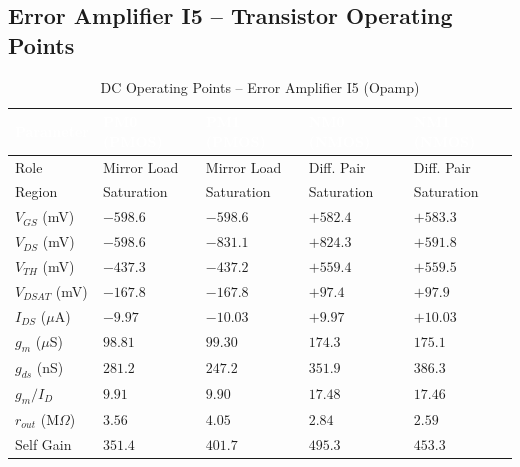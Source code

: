 \documentclass[12pt,a4paper]{article}
\begin{document}
\subsection{Error Amplifier I5 -- Transistor Operating Points}

\begin{table}[H]
  \centering
  \caption{DC Operating Points -- Error Amplifier I5 (Opamp)}
  \renewcommand{\arraystretch}{1.4}
  \begin{tabularx}{\textwidth}{lXXXX}
    \toprule
    \rowcolor{headerblue}
    \textcolor{white}{\textbf{Parameter}}
      & \textcolor{white}{\textbf{PM0 (PMOS)}}
      & \textcolor{white}{\textbf{PM1 (PMOS)}}
      & \textcolor{white}{\textbf{NM0 (NMOS)}}
      & \textcolor{white}{\textbf{NM1 (NMOS)}} \\
    \midrule
    \rowcolor{rowgray}
    Role              & Mirror Load & Mirror Load & Diff. Pair & Diff. Pair \\
    Region            & Saturation  & Saturation  & Saturation & Saturation \\
    \rowcolor{rowgray}
    $V_{GS}$ (mV)    & $-598.6$    & $-598.6$    & $+582.4$   & $+583.3$   \\
    $V_{DS}$ (mV)    & $-598.6$    & $-831.1$    & $+824.3$   & $+591.8$   \\
    \rowcolor{rowgray}
    $V_{TH}$ (mV)    & $-437.3$    & $-437.2$    & $+559.4$   & $+559.5$   \\
    $V_{DSAT}$ (mV)  & $-167.8$    & $-167.8$    & $+97.4$    & $+97.9$    \\
    \rowcolor{rowgray}
    $I_{DS}$ ($\mu$A) & $-9.97$   & $-10.03$    & $+9.97$    & $+10.03$   \\
    $g_m$ ($\mu$S)   & $98.81$     & $99.30$     & $174.3$    & $175.1$    \\
    \rowcolor{rowgray}
    $g_{ds}$ (nS)    & $281.2$     & $247.2$     & $351.9$    & $386.3$    \\
    $g_m/I_D$        & $9.91$      & $9.90$      & $17.48$    & $17.46$    \\
    \rowcolor{rowgray}
    $r_{out}$ (M$\Omega$) & $3.56$ & $4.05$   & $2.84$     & $2.59$     \\
    Self Gain         & $351.4$     & $401.7$     & $495.3$    & $453.3$    \\
    \bottomrule
  \end{tabularx}
\end{table}
\end{document}
